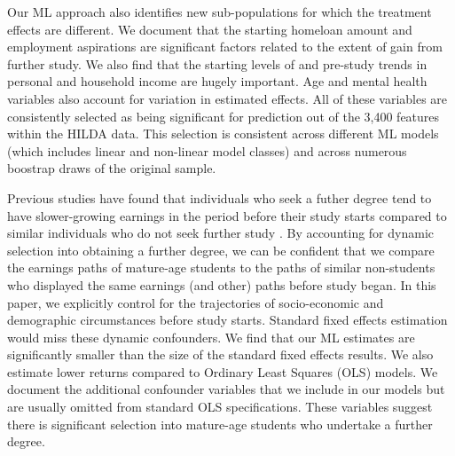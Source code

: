 \documentclass[12pt, a4paper]{article}
\begin{document}
Our ML approach also identifies new sub-populations for which the treatment
effects are different. We document that the starting homeloan amount and
employment aspirations are significant factors related to the extent of gain
from further study. We also find that the starting levels of and pre-study
trends in personal and household income are hugely important. Age and mental
health variables also account for variation in estimated effects. All of these
variables are consistently selected as being significant for prediction out of
the 3,400 features within the HILDA data. This selection is consistent across
different ML models (which includes linear and non-linear model classes) and
across numerous boostrap draws of the original sample.

Previous studies have found that individuals who seek a futher degree tend to
have slower-growing earnings in the period before their study starts compared
to similar individuals who do not seek further study \citep{jacobson2005,
dynarski2016, dynarski2018}. By accounting for dynamic selection into obtaining
a further degree, we can be confident that we compare the earnings paths of
mature-age students to the paths of similar non-students who displayed the same
earnings (and other) paths before study began. In this paper, we explicitly
control for the trajectories of socio-economic and demographic circumstances
before study starts. Standard fixed effects estimation would miss these dynamic
confounders. We find that our ML estimates are significantly smaller than the
size of the standard fixed effects results. We also estimate lower returns
compared to Ordinary Least Squares (OLS) models. We document the additional
confounder variables that we include in our models but are usually omitted from
standard OLS specifications. These variables suggest there is significant
selection into mature-age students who undertake a further degree.

\end{document}
